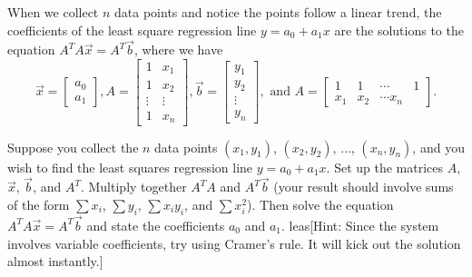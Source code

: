 \begin{theorem}
When we collect $n$ data points and notice the points follow a linear trend, the coefficients of the least square regression line $y=a_0+a_1x$ are the solutions to the equation $A^T A\vec x = A^T\vec b$, where we have $$
\vec x =
\begin{bmatrix}
a_0\\
a_1
\end{bmatrix}
,
A = \begin{bmatrix}
1&x_1\\
1&x_2\\ 
\vdots&\vdots\\
1&x_n
\end{bmatrix}
,
\vec b =
\begin{bmatrix}
y_1\\
y_2\\ 
\vdots\\
y_n
\end{bmatrix}
,\text{ and }
A = \begin{bmatrix}
1&1&\cdots&1\\
x_1&x_2&\cdots x_n
\end{bmatrix}
.$$
\end{theorem}

\begin{problem}\label{getting the least square regression coefficients using the transpose}
 Suppose you collect the $n$ data points $(x_1,y_1)$, $(x_2,y_2)$, $\ldots$, $(x_n,y_n)$, and you wish to find the least squares regression line $y=a_0+a_1x$. Set up the matrices $A$, $\vec x$, $\vec b$, and $A^T$. Multiply together $A^TA$ and $A^T\vec b$ (your result should involve sums of the form $\sum x_i$, $\sum y_i$, $\sum x_iy_i$, and $\sum x_i^2$). Then solve the equation $A^TA\vec x = A^T\vec b$ and state the coefficients $a_0$ and $a_1$. leas[Hint: Since the system involves variable coefficients, try using Cramer's rule. It will kick out the solution almost instantly.]
\end{problem}


